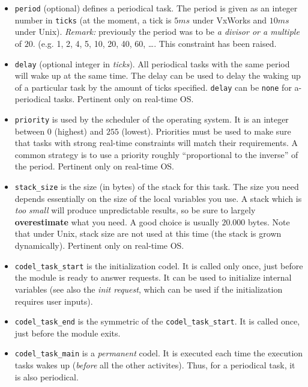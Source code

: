 \begin{itemize}
\item {\tt period} (optional) defines a periodical task. The period is
given as an integer number in {\tt ticks} (at the moment, a tick is $5ms$
under VxWorks and $10ms$ under Unix). {\em Remark:} previously the period was to be 
{\em a divisor or a multiple} of $20$. (e.g. 1, 2, 4, 5, 10, 20, 40, 60,
\ldots. This constraint has been raised.

\item {\tt delay} (optional integer in {\em ticks}). All periodical
tasks with the same period  will wake up at the  same time. The delay can
be used to delay the waking up of a particular task  by the amount of ticks 
specified. {\tt delay} can be {\tt none} for  a-periodical tasks. Pertinent only on real-time OS.

\item {\tt priority} is used by the scheduler of the operating system. It
is an integer  between $0$ (highest) and  $255$ (lowest). Priorities must
be used to make  sure that tasks  with strong real-time constraints  will
match their requirements.  A common strategy is to use a priority roughly
``proportional to the inverse'' of the period. Pertinent only on real-time OS.

\item {\tt stack\_size} is the size (in bytes) of the stack for this
task. The size you  need  depends essentially on   the size of the  local
variables you  use.  A   stack which  is {\em   too small} will   produce
unpredictable results, so be sure  to largely {\bf overestimate} what you
need.   A  good choice is  usually   $20.000$  bytes. Note that under
Unix, stack size are not used at this time (the stack is grown dynamically).  Pertinent only on real-time OS.

\item {\tt codel\_task\_start} is the initialization codel. It is called only
once, just before the module is ready to answer requests.  It can be used
to initialize internal variables (see also  the {\em init request}, which
can be used if the initialization requires user inputs).

\item {\tt codel\_task\_end} is the symmetric of the {\tt codel\_task\_start}. It
is called once, just before the module exits.

\item {\tt codel\_task\_main} is a {\em permanent} codel. It is executed each time
the execution tasks wakes  up ({\em before} all the other activites). Thus, for  a  periodical task, it is  also
periodical.


\end{itemize}
